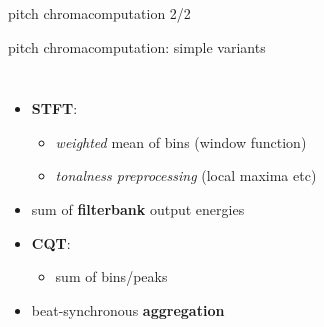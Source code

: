         \begin{frame}{pitch chroma}{computation 2/2}
        \end{frame}
        \begin{frame}{pitch chroma}{computation: simple variants}
					\vspace{-5mm}
            \begin{columns}
            \begin{itemize}
                \item	\textbf{STFT}: 
                    \begin{itemize}
                        \item   \textit{weighted} mean of bins (window function)
                        \item	\textit{tonalness preprocessing} (local maxima etc)
                    \end{itemize}
                    
								\bigskip
                \item<2->	sum of \textbf{filterbank} output energies
                
								\bigskip
                \item<3->	\textbf{CQT}: 
                    \begin{itemize}
                        \item sum of bins/peaks
                    \end{itemize}
										
								\bigskip
                \item<4->   beat-synchronous \textbf{aggregation}
            \end{itemize}
            
            \end{columns}
        \end{frame}
